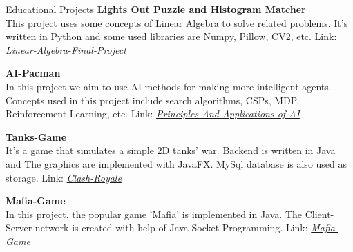 \documentclass{resume}
\begin{document}
\begin{rSection}{Educational Projects}
    {\bf Lights Out Puzzle and Histogram Matcher}
    \\This project uses some concepts of Linear Algebra to solve related problems. It's written in Python and 
    some used libraries are Numpy, Pillow, CV2, etc. Link: \href{https://github.com/SepehrNoey/linear-algebra-final-project}
    {\em Linear-Algebra-Final-Project}
    
    {\bf AI-Pacman}
    \\In this project we aim to use AI methods for making more intelligent agents. Concepts used in this project 
    include search algorithms, CSPs, MDP, Reinforcement Learning, etc. Link: \href{https://github.com/SepehrNoey/Principles_and_Applications_of_AI}
    {\em Principles-And-Applications-of-AI}

    {\bf Tanks-Game}
    \\It's a game that simulates a simple 2D tanks' war. Backend is written in Java and The graphics are implemented 
    with JavaFX. MySql database is also used as storage. Link: \href{https://github.com/SepehrNoey/Clash-Royale}{\em Clash-Royale}

    {\bf Mafia-Game}
    \\In this project, the popular game 'Mafia' is implemented in Java. The Client-Server network is created with help of 
    Java Socket Programming. Link: \href{https://github.com/SepehrNoey/Mafia-game/tree/master}{\em Mafia-Game}
\end{rSection}
\end{document}

